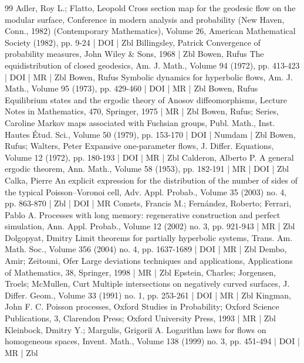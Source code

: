 \documentclass[10pt]{amsart}
\theoremstyle{definition}\newtheorem{defi}[theo]{Definition}\newtheorem{rema}[theo]{Remark}\newtheorem{exam}[theo]{Example}\newtheorem{exem}[theo]{Example}\newtheorem{nota}[theo]{Notation}
\begin{document}
\begin{thebibliography}{99}
Adler, Roy L.; Flatto, Leopold Cross section map for the geodesic flow on the modular surface, Conference in modern analysis and probability (New Haven, Conn., 1982) (Contemporary Mathematics), Volume 26, American Mathematical Society (1982), pp. 9-24 | DOI | Zbl
Billingsley, Patrick Convergence of probability measures, John Wiley \& Sons, 1968 | Zbl
Bowen, Rufus The equidistribution of closed geodesics, Am. J. Math., Volume 94 (1972), pp. 413-423 | DOI | MR | Zbl
Bowen, Rufus Symbolic dynamics for hyperbolic flows, Am. J. Math., Volume 95 (1973), pp. 429-460 | DOI | MR | Zbl
Bowen, Rufus Equilibrium states and the ergodic theory of Anosov diffeomorphisms, Lecture Notes in Mathematics, 470, Springer, 1975 | MR | Zbl
Bowen, Rufus; Series, Caroline Markov maps associated with Fuchsian groups, Publ. Math., Inst. Hautes Étud. Sci., Volume 50 (1979), pp. 153-170 | DOI | Numdam | Zbl
Bowen, Rufus; Walters, Peter Expansive one-parameter flows, J. Differ. Equations, Volume 12 (1972), pp. 180-193 | DOI | MR | Zbl
Calderon, Alberto P. A general ergodic theorem, Ann. Math., Volume 58 (1953), pp. 182-191 | MR | DOI | Zbl
Calka, Pierre An explicit expression for the distribution of the number of sides of the typical Poisson–Voronoi cell, Adv. Appl. Probab., Volume 35 (2003) no. 4, pp. 863-870 | Zbl | DOI | MR
Comets, Francis M.; Fernández, Roberto; Ferrari, Pablo A. Processes with long memory: regenerative construction and perfect simulation, Ann. Appl. Probab., Volume 12 (2002) no. 3, pp. 921-943 | MR | Zbl
Dolgopyat, Dmitry Limit theorems for partially hyperbolic systems, Trans. Am. Math. Soc., Volume 356 (2004) no. 4, pp. 1637-1689 | DOI | MR | Zbl
Dembo, Amir; Zeitouni, Ofer Large deviations techniques and applications, Applications of Mathematics, 38, Springer, 1998 | MR | Zbl
Epstein, Charles; Jorgensen, Troels; McMullen, Curt Multiple intersections on negatively curved surfaces, J. Differ. Geom., Volume 33 (1991) no. 1, pp. 253-261 | DOI | MR | Zbl
Kingman, John F. C. Poisson processes, Oxford Studies in Probability; Oxford Science Publications, 3, Clarendon Press; Oxford University Press, 1993 | MR | Zbl
Kleinbock, Dmitry Y.; Margulis, Grigoriĭ A. Logarithm laws for flows on homogeneous spaces, Invent. Math., Volume 138 (1999) no. 3, pp. 451-494 | DOI | MR | Zbl

\end{thebibliography}
\end{document}
